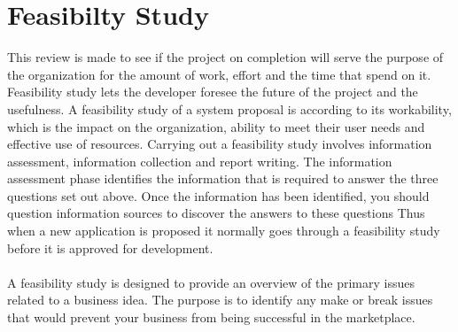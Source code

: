 \section{Feasibilty Study}
This review is made to see if the project on completion will serve the purpose of the organization for the amount of work, effort and the time that spend on it. Feasibility study lets the developer foresee the future of the project and the usefulness. A feasibility study of a system proposal is according to its workability, which is the impact on the organization, ability to meet their user needs and effective use of resources. Carrying out a feasibility study involves information assessment, information collection and report writing. The information assessment phase identifies the information that is required to answer the three questions set out above. Once the information has been identified, you should question information sources to discover the answers to these questions Thus when a new application is proposed it normally goes through a feasibility study before it is approved for development.\\\\

A feasibility study is designed to provide an overview of the primary issues related to a business idea. The purpose is to identify any make or break issues that would prevent your business from being successful in the marketplace.\\\\%

